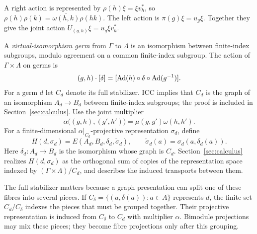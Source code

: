 A right action is represented by $\rho(h)\xi=\xi v_h^*$, so
$\rho(h)\rho(k)=\overline{\omega(h,k)}\rho(hk)$.
The left action is $\pi(g)\xi=u_g\xi$. Together they give the joint
action $U_{(g,h)}\xi=u_g\xi v_h^*$.


A \emph{virtual-isomorphism germ} from $\Gamma$ to $\Lambda$ is an
isomorphism between finite-index subgroups, modulo agreement on a common
finite-index subgroup. The action of $\Gamma\times\Lambda$ on germs is
\[
 (g,h)\cdot[\delta]
   =[\operatorname{Ad}(h)\circ\delta\circ\operatorname{Ad}(g^{-1})].
\]
For a germ $d$ let $C_d$ denote its full stabilizer. ICC implies that $C_d$
is the graph of an isomorphism $A_d\to B_d$ between finite-index subgroups;
the proof is included in Section~\ref{sec:calculus}. Use the joint
multiplier
\begin{equation}\label{eq:intro-joint}
 \alpha\bigl((g,h),(g',h')\bigr)
 =\mu(g,g')\overline{\omega(h,h')}.
\end{equation}
For a finite-dimensional $\alpha|_{C_d}$-projective representation
$\sigma_d$, define
\[
 H(d,\sigma_d)=E(A_d,B_d,\delta_d,\widetilde\sigma_d),
 \qquad \widetilde\sigma_d(a)=\sigma_d(a,\delta_d(a)).
\]
Here $\delta_d:A_d\to B_d$ is the isomorphism whose graph is $C_d$.
Section~\ref{sec:calculus} realizes $H(d,\sigma_d)$ as the orthogonal
sum of copies of the representation space indexed by
$(\Gamma\times\Lambda)/C_d$, and describes the induced transports
between them.

The full stabilizer matters because a graph presentation can split one
of these fibres into several pieces. If
$C_\delta=\{(a,\delta(a)):a\in A\}$ represents $d$, the finite set
$C_d/C_\delta$ indexes the pieces that must be grouped together.
Their projective representation is induced from $C_\delta$ to $C_d$
with multiplier $\alpha$. Bimodule projections may mix these pieces;
they become fibre projections only after this grouping.

